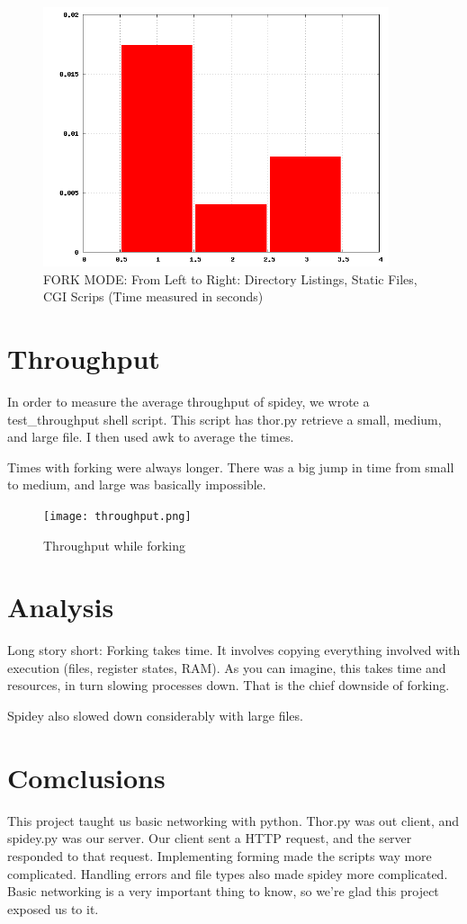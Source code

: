 \documentclass[letterpaper]{article}
\begin{document}
\begin{figure}[h!]
\centering
\includegraphics[width=4in]{fork.png}
\caption{FORK MODE: From Left to Right: Directory Listings, Static Files, CGI Scrips (Time measured in seconds)}
\label{fig:Plot}
\end{figure}

\section*{Throughput}

In order to measure the average throughput of spidey, we wrote a test_throughput shell script. This script has thor.py retrieve a small, medium, and large file. I then used awk to average the times.

Times with forking were always longer. There was a big jump in time from small to medium, and large was basically impossible.

\begin{figure}[h!]
\centering
\texttt{[image: throughput.png]}
\caption{Throughput while forking}
\label{fig:PLOT}
\end{figure}

\section*{Analysis}

Long story short: Forking takes time. It involves copying everything involved with execution (files, register states, RAM). As you can imagine, this takes time and resources, in turn slowing processes down. That is the chief downside of forking. 

Spidey also slowed down considerably with large files.

\section*{Comclusions}

This project taught us basic networking with python. Thor.py was out client, and spidey.py was our server. Our client sent a HTTP request, and the server responded to that request.  Implementing forming made the scripts way more complicated. Handling errors and file types also made spidey more complicated. Basic networking is a very important thing to know, so we're glad this project exposed us to it.
\end{document}
